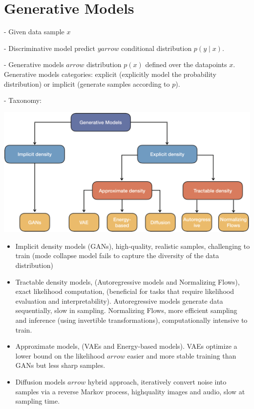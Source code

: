 \section*{Generative Models}

- Given data sample $x$ 

- Discriminative model predict $y arrow$ conditional distribution $p(y \mid x)$. 

- Generative models $arrow$ distribution $p(x)$ defined over the datapoints $x$. Generative models  categories: explicit (explicitly model the probability distribution) or implicit (generate samples according to $p$).

- Taxonomy: 

\includegraphics*[width=0.9\columnwidth]{figures/generative_taxonomy.png}


\begin{itemize}
  \item Implicit density models (GANs), high-quality, realistic samples, challenging to train (mode collapse model fails to capture the diversity of the data distribution)

  \item Tractable density models, (Autoregressive models and Normalizing Flows), exact likelihood computation, (beneficial for tasks that require likelihood evaluation and interpretability). Autoregressive models generate data sequentially, slow in sampling. Normalizing Flows, more efficient sampling and inference (using invertible transformations), computationally intensive to train.

  \item Approximate models, (VAEs and Energy-based models). VAEs optimize a lower bound on the likelihood $arrow$ easier and more stable training than GANs but less sharp samples.

  \item Diffusion models $arrow$ hybrid approach, iteratively convert noise into samples via a reverse Markov process, highquality images and audio, slow at sampling time.

\end{itemize}


